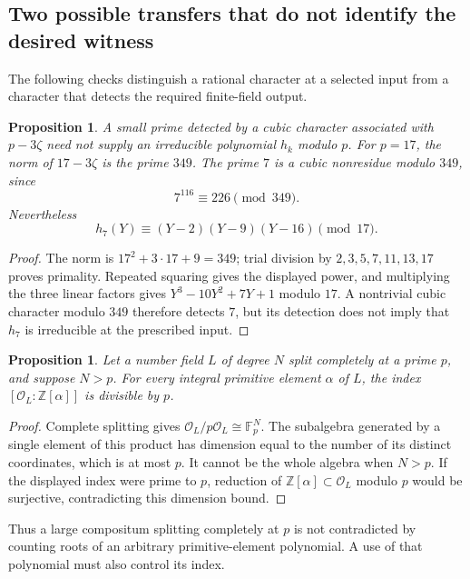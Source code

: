 \documentclass[11pt]{article}
\newtheorem{proposition}[theorem]{Proposition}
\theoremstyle{definition}
\theoremstyle{remark}
\begin{document}
\subsection{Two possible transfers that do not identify the desired witness}
The following checks distinguish a rational character at a selected
input from a character that detects the required finite-field output.

\begin{proposition}\label{prop:parameter-character-counterexample}
A small prime detected by a cubic character associated with
$p-3\zeta$ need not supply an irreducible polynomial $h_k$ modulo $p$.
For $p=17$, the norm of $17-3\zeta$ is the prime $349$.
The prime $7$ is a cubic nonresidue modulo $349$, since
\[
 7^{116}\equiv226\pmod{349}.
\]
Nevertheless
\[
 h_7(Y)\equiv(Y-2)(Y-9)(Y-16)\pmod{17}.
\]
\end{proposition}
\begin{proof}
The norm is $17^2+3\cdot17+9=349$; trial division by
$2,3,5,7,11,13,17$ proves primality.  Repeated squaring gives
the displayed power, and multiplying the three linear factors
gives $Y^3-10Y^2+7Y+1$ modulo $17$.  A nontrivial cubic
character modulo $349$ therefore detects $7$, but its detection
does not imply that $h_7$ is irreducible at the prescribed input.
\end{proof}

\begin{proposition}\label{prop:split-index-obstruction}
Let a number field $L$ of degree $N$ split completely at a prime
$p$, and suppose $N>p$.  For every integral primitive element
$\alpha$ of $L$, the index $[\mathcal O_L:\mathbb Z[\alpha]]$
is divisible by $p$.
\end{proposition}
\begin{proof}
Complete splitting gives
$\mathcal O_L/p\mathcal O_L\cong\mathbb F_p^N$.
The subalgebra generated by a single element of this product
has dimension equal to the number of its distinct coordinates,
which is at most $p$.  It cannot be the whole algebra when
$N>p$.  If the displayed index were prime to $p$, reduction
of $\mathbb Z[\alpha]\subset\mathcal O_L$ modulo $p$ would be
surjective, contradicting this dimension bound.
\end{proof}
Thus a large compositum splitting completely at $p$ is not
contradicted by counting roots of an arbitrary primitive-element
polynomial.  A use of that polynomial must also control its index.
\end{document}
